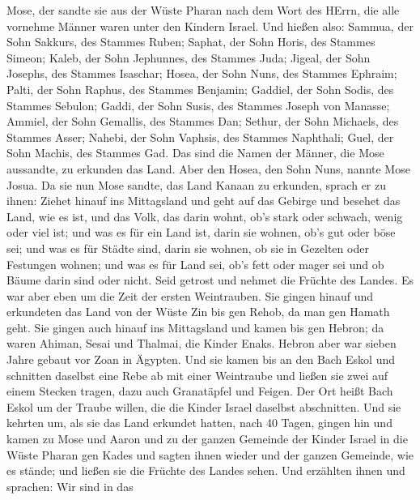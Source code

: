  Mose, der sandte sie aus der Wüste Pharan nach dem Wort des
HErrn, die alle vornehme Männer waren unter den Kindern Israel.
 Und hießen also: Sammua, der Sohn Sakkurs, des Stammes
Ruben;  Saphat, der Sohn Horis, des Stammes Simeon;
 Kaleb, der Sohn Jephunnes, des Stammes Juda; 
Jigeal, der Sohn Josephs, des Stammes Isaschar;  Hosea, der
Sohn Nuns, des Stammes Ephraim;  Palti, der Sohn Raphus, des
Stammes Benjamin;  Gaddiel, der Sohn Sodis, des Stammes
Sebulon;  Gaddi, der Sohn Susis, des Stammes Joseph von
Manasse;  Ammiel, der Sohn Gemallis, des Stammes Dan;
 Sethur, der Sohn Michaels, des Stammes Asser;
 Nahebi, der Sohn Vaphsis, des Stammes Naphthali;
 Guel, der Sohn Machis, des Stammes Gad.  Das
sind die Namen der Männer, die Mose aussandte, zu erkunden das Land.
Aber den Hosea, den Sohn Nuns, nannte Mose Josua.  Da sie
nun Mose sandte, das Land Kanaan zu erkunden, sprach er zu ihnen: Ziehet
hinauf ins Mittagsland und geht auf das Gebirge  und
besehet das Land, wie es ist, und das Volk, das darin wohnt, ob's stark
oder schwach, wenig oder viel ist;  und was es für ein Land
ist, darin sie wohnen, ob's gut oder böse sei; und was es für Städte
sind, darin sie wohnen, ob sie in Gezelten oder Festungen wohnen;
 und was es für Land sei, ob's fett oder mager sei und ob
Bäume darin sind oder nicht. Seid getrost und nehmet die Früchte des
Landes. Es war aber eben um die Zeit der ersten Weintrauben.
 Sie gingen hinauf und erkundeten das Land von der Wüste
Zin bis gen Rehob, da man gen Hamath geht.  Sie gingen auch
hinauf ins Mittagsland und kamen bis gen Hebron; da waren Ahiman, Sesai
und Thalmai, die Kinder Enaks. Hebron aber war sieben Jahre gebaut vor
Zoan in Ägypten.  Und sie kamen bis an den Bach Eskol und
schnitten daselbst eine Rebe ab mit einer Weintraube und ließen sie zwei
auf einem Stecken tragen, dazu auch Granatäpfel und Feigen.
 Der Ort heißt Bach Eskol um der Traube willen, die die
Kinder Israel daselbst abschnitten.  Und sie kehrten um,
als sie das Land erkundet hatten, nach 40 Tagen,  gingen
hin und kamen zu Mose und Aaron und zu der ganzen Gemeinde der Kinder
Israel in die Wüste Pharan gen Kades und sagten ihnen wieder und der
ganzen Gemeinde, wie es stände; und ließen sie die Früchte des Landes
sehen.  Und erzählten ihnen und sprachen: Wir sind in das
